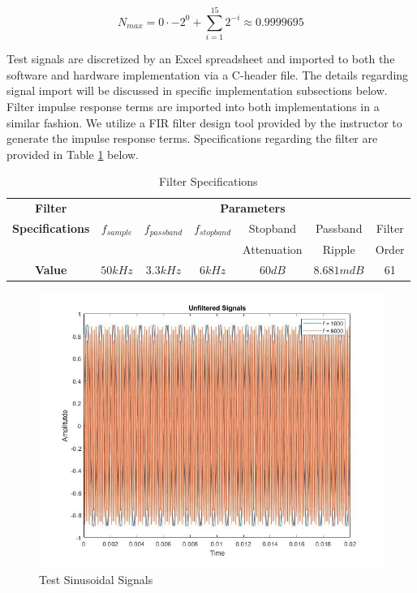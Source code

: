 \documentclass[conference]{IEEEtran}
\begin{document}
\begin{equation}
    N_{max} = 0 \cdot -2^0 + \sum_{i=1}^{15} 2^{-i} \approx 0.9999695
    \label{1-15_max}
\end{equation}

Test signals are discretized by an Excel spreadsheet and imported to both the software and hardware implementation via a C-header file. The details regarding signal import will be discussed in specific implementation subsections below. Filter impulse response terms are imported into both implementations in a similar fashion. We utilize a FIR filter design tool \cite{b2} provided by the instructor to generate the impulse response terms. Specifications regarding the filter are provided in Table \ref{filter_specs} below.

\begin{table}[!t]
\centering
\caption{Filter Specifications}
    \begin{tabular}{|c|c|c|c|c|c|c|}
    \hline
    \textbf{Filter}&\multicolumn{6}{|c|}{\textbf{Parameters}} \\
    \cline{2-7}
    \textbf{Specifications} & \textbf{$f_{sample}$} & $f_{passband}$ & $f_{stopband}$ & Stopband & Passband & Filter\\
    &&&& Attenuation & Ripple & Order\\
    \hline
    \textbf{Value} & \textbf{\textit{$50kHz$}} & $3.3kHz$ & $6kHz$ & $60dB$ & $8.681mdB$ & 61\\
    \hline
    \end{tabular}
\label{filter_specs}
\end{table}

\begin{figure}[htbp]
    \centerline{\includegraphics[width=\linewidth]{Figures/Filter/unfiltered_signals.jpg}}
    \caption{Test Sinusoidal Signals}
    \label{input_sin}
\end{figure}
\end{document}
